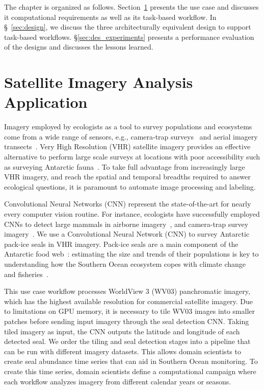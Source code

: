The chapter is organized as follows.
Section~\ref{sec:ucase} presents the use case and discusses it computational requirements as well as its task-based workflow.
In \S~\ref{sec:design}, we discuss the three architecturally equivalent design to support task-based workflows.
 \S\ref{sec:des_experiments} presents a performance evaluation of the designs and discusses the lessons learned.

\section{Satellite Imagery Analysis Application}
\label{sec:ucase}
Imagery employed by ecologists as a tool to survey populations and ecosystems come from a wide range of sensors, e.g., camera-trap surveys~\cite{karanth1995estimating} and aerial imagery transects~\cite{western2009impact}.
Very High Resolution (VHR) satellite imagery provides an effective alternative to perform large scale surveys at locations with poor accessibility such as surveying Antarctic fauna~\cite{lynch2012detection}.
To take full advantage from increasingly large VHR imagery, and reach the spatial and temporal breadths required to answer ecological questions, it is paramount to automate image processing and labeling.

Convolutional Neural Networks (CNN) represent the state-of-the-art for nearly every computer vision routine.
For instance, ecologists have successfully employed CNNs to detect large mammals in airborne imagery~\cite{kellenberger2018detecting,polzounov2016right}, and camera-trap survey imagery~\cite{norouzzadeh2018automatically}.
We use a Convolutional Neural Network (CNN) to survey Antarctic pack-ice seals in VHR imagery.
Pack-ice seals are a main component of the Antarctic food web~\cite{fabra2008convention}: estimating the size and trends of their populations is key to understanding how the Southern Ocean ecosystem copes with climate change~\cite{hillebrand2018climate} and fisheries~\cite{reid2019climate}.

This use case workflow processes WorldView 3 (WV03) panchromatic imagery, which has the highest available resolution for commercial satellite imagery.
Due to limitations on GPU memory, it is necessary to tile WV03 images into smaller patches before sending input imagery through the seal detection CNN.
Taking tiled imagery as input, the CNN outputs the latitude and longitude of each detected seal.
We order the tiling and seal detection stages into a pipeline that can be run with different imagery datasets.
This allows domain scientists to create seal abundance time series that can aid in Southern Ocean monitoring.
To create this time series, domain scientists define a computational campaign where each workflow analyzes imagery from different calendar years or seasons.


